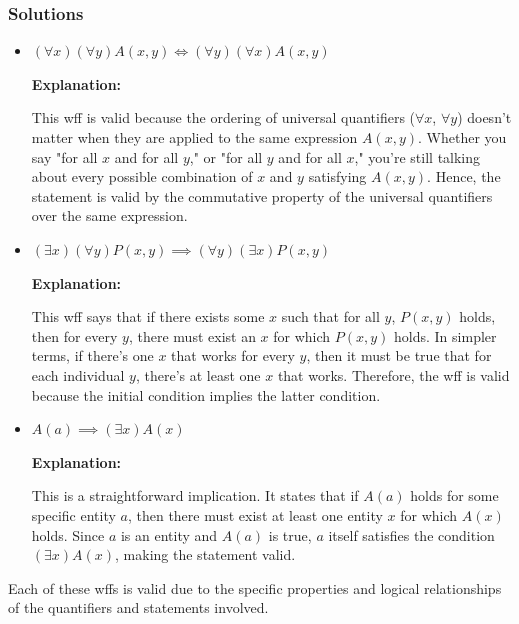 \documentclass[12pt]{article}
\begin{document}
\subsubsection*{Solutions}

\begin{itemize}
    \item[a.] \((\forall x)(\forall y)A(x, y) \iff (\forall y)(\forall x) A(x, y)\)
    
    \textbf{Explanation:}
    
    This wff is valid because the ordering of universal quantifiers (\( \forall x \), \( \forall y \)) doesn't matter when they are applied to the same expression \( A(x, y) \). Whether you say "for all \( x \) and for all \( y \)," or "for all \( y \) and for all \( x \)," you're still talking about every possible combination of \( x \) and \( y \) satisfying \( A(x, y) \). Hence, the statement is valid by the commutative property of the universal quantifiers over the same expression.
    
    \item[c.] \((\exists x)(\forall y)P(x, y) \implies (\forall y)(\exists x)P(x, y)\)
    
    \textbf{Explanation:}
    
    This wff says that if there exists some \( x \) such that for all \( y \), \( P(x, y) \) holds, then for every \( y \), there must exist an \( x \) for which \( P(x, y) \) holds. In simpler terms, if there's one \( x \) that works for every \( y \), then it must be true that for each individual \( y \), there's at least one \( x \) that works. Therefore, the wff is valid because the initial condition implies the latter condition.
    
    \item[d.] \(A(a) \implies (\exists x)A(x)\)
    
    \textbf{Explanation:}
    
    This is a straightforward implication. It states that if \( A(a) \) holds for some specific entity \( a \), then there must exist at least one entity \( x \) for which \( A(x) \) holds. Since \( a \) is an entity and \( A(a) \) is true, \( a \) itself satisfies the condition \( (\exists x)A(x) \), making the statement valid.
    
\end{itemize}

Each of these wffs is valid due to the specific properties and logical relationships of the quantifiers and statements involved.
\newpage
\end{document}
